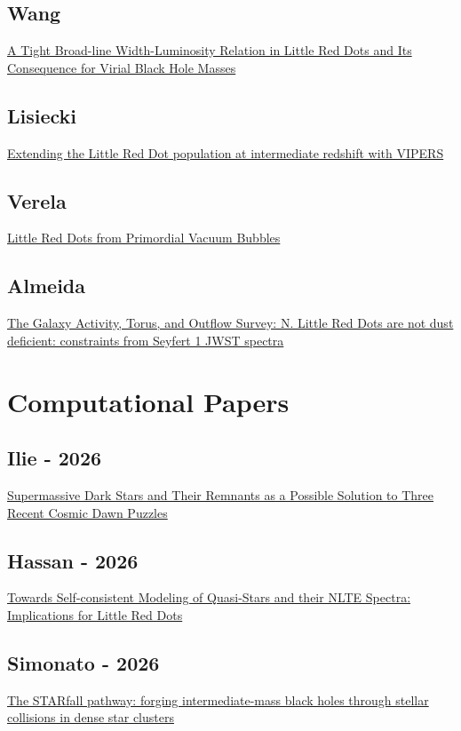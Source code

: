 \documentclass{article}
\begin{document}
\subsection*{Wang}
\href{https://arxiv.org/abs/2611.24217}{A Tight Broad-line Width-Luminosity Relation in Little Red Dots and Its Consequence for Virial Black Hole Masses}

\subsection*{Lisiecki}
\href{https://arxiv.org/abs/2609.10319}{Extending the Little Red Dot population at intermediate redshift with VIPERS}

\subsection*{Verela}
\href{https://arxiv.org/abs/2611.26620}{Little Red Dots from Primordial Vacuum Bubbles}

\subsection*{Almeida}
\href{https://arxiv.org/abs/2611.26483}{The Galaxy Activity, Torus, and Outflow Survey: N. Little Red Dots are not dust deficient: constraints from Seyfert 1 JWST spectra}

\section*{Computational Papers}

\subsection*{Ilie - 2026}
\href{https://ui.adsabs.harvard.edu/abs/2026Univ...12....1I/abstract}{Supermassive Dark Stars and Their Remnants as a Possible Solution to Three Recent Cosmic Dawn Puzzles}

\subsection*{Hassan - 2026}
\href{https://ui.adsabs.harvard.edu/abs/2026arXiv261103819H/abstract}{Towards Self-consistent Modeling of Quasi-Stars and their NLTE Spectra: Implications for Little Red Dots}

\subsection*{Simonato - 2026}
\href{https://ui.adsabs.harvard.edu/abs/2026arXiv261103812S/abstract}{The STARfall pathway: forging intermediate-mass black holes through stellar collisions in dense star clusters}
\end{document}
